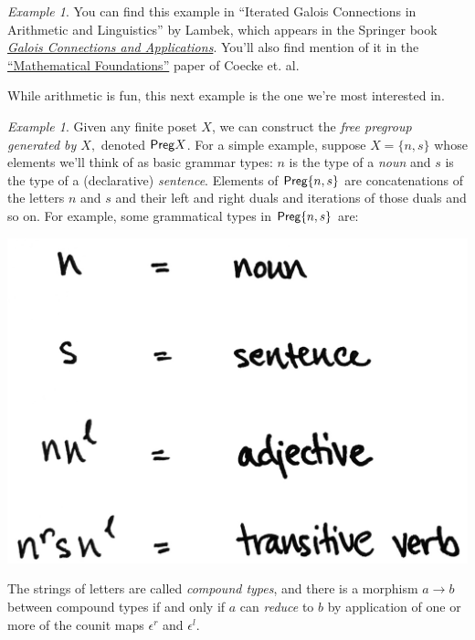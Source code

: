 \documentclass{tufte-handout-tai}
\newcommand{\cat}[1]{{\normalfont\textsf{#1}}}
\theoremstyle{plain}
\theoremstyle{definition}
\theoremstyle{remark}
\newtheorem{ex}[thm]{Example}
\begin{document}
\begin{ex}
You can find this example in ``Iterated Galois Connections in Arithmetic and Linguistics'' by Lambek, which appears in the Springer book \href{https://www.springer.com/us/book/9781402018978}{\textit{Galois Connections and Applications}}. You'll also find mention of it in the \href{https://arxiv.org/abs/1003.4394}{``Mathematical Foundations''} paper of Coecke et. al.
\end{ex}

While arithmetic is fun, this next example is the one we're most interested in. 

\begin{ex}
Given any finite poset $X$, we can construct the \textit{free pregroup generated by $X,$} denoted $\cat{Preg}X$. For a simple example, suppose $X=\{n,s\}$ whose elements we'll think of as basic grammar types: $n$ is the type of a \textit{noun} and $s$ is the type of a (declarative) \textit{sentence}. Elements of $\cat{Preg}\{n,s\}$ are concatenations of the letters $n$ and $s$ and their left and right duals and iterations of those duals and so on. For example, some grammatical types in $\cat{Preg}\{n,s\}$ are:
\begin{center}
\includegraphics[width=!,totalheight=!,scale=4]{types.jpg}
\end{center}
The strings of letters are called \textit{compound types}, and there is a morphism $a\to b$ between compound types if and only if $a$ can \textit{reduce} to $b$ by application of one or more of the counit maps $\epsilon^r$ and $\epsilon ^l$.


\end{ex}
\end{document}
